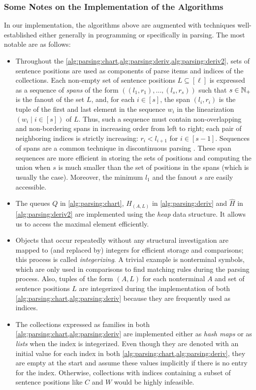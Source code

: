 \documentclass[../../document.tex]{subfiles}
\begin{document}
    \subsubsection*{Some Notes on the Implementation of the Algorithms}
    In our implementation, the algorithms above are augmented with techniques well-established either generally in programming or specifically in parsing.
    The most notable are as follows:
    \begin{itemize}
        \item Throughout the \cref{alg:parsing:chart,alg:parsing:deriv,alg:parsing:deriv2}, sets of sentence positions are used as components of parse items and indices of the collections.
            Each non-empty set of sentence positions \(L \subseteq [\ell]\) is expressed as a sequence of \emph{spans} of the form \(((l_1, r_1), \ldots, (l_s, r_s))\) such that \(s\in \mathbb{N}_+\) is the fanout of the set \(L\), and, for each \(i \in [s]\), the span \((l_i, r_i)\) is the tuple of the first and last element in the sequence \(w_i\) in the linearization \((w_i \mid i \in [s])\) of \(L\).
            Thus, such a sequence must contain non-overlapping and non-bordering spans in increasing order from left to right; each pair of neighboring indices is strictly increasing: \(r_i < l_{i+1}\) for \(i \in [s-1]\).
            Sequences of spans are a common technique in discontinuous parsing \citep[e.g.][cf.\@ range vector in Definition~6.6]{Kal10}.
            These span sequences are more efficient in storing the sets of positions and computing the union when \(s\) is much smaller than the set of positions in the spans (which is usually the case).
            Moreover, the minimum \(l_1\) and the fanout \(s\) are easily accessible.
        \item The queues \(Q\) in \cref{alg:parsing:chart}, \(H_{(A,L)}\) in \cref{alg:parsing:deriv} and \(\hat{H}\) in \cref{alg:parsing:deriv2} are implemented using the \emph{heap} data structure.
            It allows us to access the maximal element efficiently.
        \item Objects that occur repeatedly without any structural investigation are mapped to (and replaced by) integers for efficient storage and comparisons; this process is called \emph{integerizing}.
            A trivial example is nonterminal symbols, which are only used in comparisons to find matching rules during the parsing process.
            Also, tuples of the form \((A, L)\) for each nonterminal \(A\) and set of sentence positions \(L\) are integerized during the implementation of both \cref{alg:parsing:chart,alg:parsing:deriv} because they are frequently used as indices.
        \item The collections expressed as families in both \cref{alg:parsing:chart,alg:parsing:deriv} are implemented either as \emph{hash maps} or as \emph{lists} when the index is integerized.
            Even though they are denoted with an initial value for each index in both \cref{alg:parsing:chart,alg:parsing:deriv}, they are empty at the start and assume these values implicitly if there is no entry for the index.
            Otherwise, collections with indices containing a subset of sentence positions like \(C\) and \(W\) would be highly infeasible.
    \end{itemize}
\end{document}
